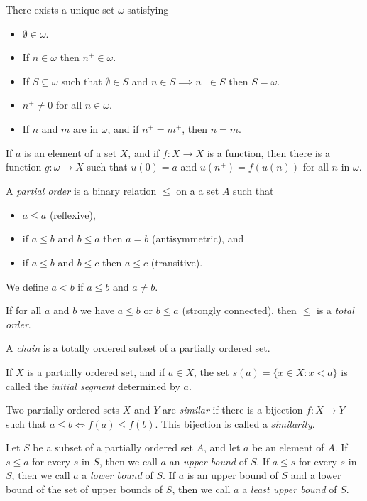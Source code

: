 \begin{prop}
  There exists a unique set $\omega$ satisfying
  \begin{itemize}
    \item $\emptyset\in\omega$.
    \item If $n\in\omega$ then $n^+\in\omega$.
    \item If $S\subseteq\omega$ such that $\emptyset\in S$ and $n\in S\implies
      n^+\in S$ then $S=\omega$.
    \item $n^+\ne 0$ for all $n\in \omega$.
    \item If $n$ and $m$ are in $\omega$, and if $n^+=m^+$, then $n=m$.
  \end{itemize}
\end{prop}
\begin{thm}[Recursion]
  If $a$ is an element of a set $X$, and if $f:X\to X$ is a function, then there
  is a function $g:\omega\to X$ such that $u(0)=a$ and $u(n^+)=f(u(n))$ for all
  $n$ in $\omega$.
\end{thm}
\begin{defn}
  A \emph{partial order} is a binary relation $\le$ on a a set $A$ such that
  \begin{itemize}
    \item $a\le a$ (reflexive),
    \item if $a\le b$ and $b\le a$ then $a=b$ (antisymmetric), and
    \item if $a\le b$ and $b\le c$ then $a\le c$ (transitive).
  \end{itemize}
  We define $a<b$ if $a\le b$ and $a\ne b$.

  If for all $a$ and $b$ we have $a\le b$ or $b\le a$ (strongly connected),
  then $\le$ is a \emph{total order}. 

  A \emph{chain} is a totally ordered subset of a partially ordered set.
\end{defn}
\begin{defn}
  If $X$ is a partially ordered set, and if $a\in X$, the set $s(a)=\{x\in
    X:x<a\}$ is called the \emph{initial segment} determined by $a$.
\end{defn}
\begin{defn}
  Two partially ordered sets $X$ and $Y$ are \emph{similar} if there is a
  bijection $f:X\to Y$ such that $a\le b\iff f(a)\le f(b)$. This bijection is
  called a \emph{similarity}.
\end{defn}
\begin{defn}
  Let $S$ be a subset of a partially ordered set $A$, and let $a$ be an element
  of $A$. If $s\le a$ for every $s$ in $S$, then we call $a$ an \emph{upper
    bound} of $S$. If $a\le s$ for every $s$ in $S$, then we call $a$ a
    \emph{lower bound} of $S$. If $a$ is an upper bound of $S$ and a lower
    bound of the set of upper bounds of $S$, then we call $a$ a \emph{least
      upper bound} of $S$.
\end{defn}
